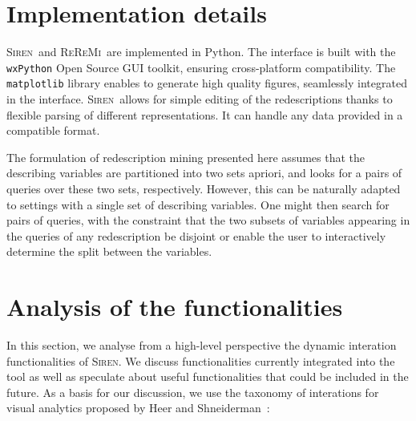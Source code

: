 \documentclass{llncs}
\newcommand{\Siren}{\textsc{Siren}}
\newcommand{\ReReMi}{\textsc{ReReMi}}
\begin{document}

\section{Implementation details}
\Siren\ and \ReReMi\ are implemented in Python.  The interface is
built with the \texttt{wxPython} Open Source GUI toolkit, ensuring
cross-platform compatibility.  The \texttt{matplotlib} library enables
to generate high quality figures, seamlessly integrated in the
interface.  \Siren\ allows for simple editing of the redescriptions
thanks to flexible parsing of different representations. It can handle
any data provided in a compatible format.

The formulation of redescription mining presented here assumes that
the describing variables are partitioned into two sets apriori, and
looks for a pairs of queries over these two sets, respectively.
However, this can be naturally adapted to settings with a single set
of describing variables.  One might then search for pairs of queries,
with the constraint that the two subsets of variables appearing in the
queries of any redescription be disjoint or enable the user to
interactively determine the split between the variables.

\section{Analysis of the functionalities}
In this section, we analyse from a high-level perspective the dynamic interation functionalities of \Siren. We discuss functionalities currently integrated into the tool as well as speculate about useful functionalities that could be included in the future.
As a basis for our discussion, we use the taxonomy of interations for visual analytics proposed by Heer and Shneiderman~\cite{Heer:2012:IDV:2133806.2133821}:
\end{document}
